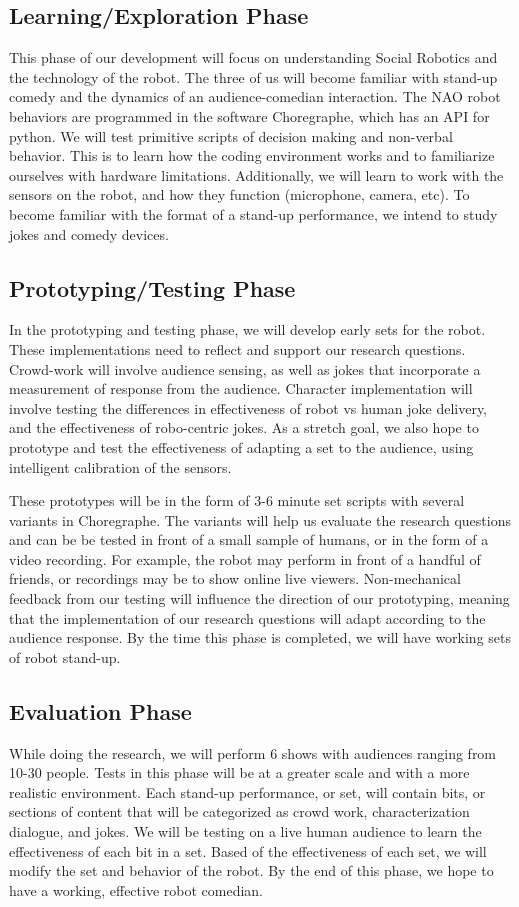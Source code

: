 \documentclass[onecolumn, draftclsnofoot,10pt, compsoc]{IEEEtran}
\begin{document}
\subsection{Learning/Exploration Phase}
This phase of our development will focus on understanding Social Robotics and the technology of the robot. The three of us will become familiar with stand-up comedy and the dynamics of an audience-comedian interaction. The NAO robot behaviors are programmed in the software Choregraphe, which has an API for python. We will test primitive scripts of decision making and non-verbal behavior. This is to learn how the coding environment works and to familiarize ourselves with hardware limitations. Additionally, we will learn to work with the sensors on the robot, and how they function (microphone, camera, etc). To become familiar with the format of a stand-up performance, we intend to study jokes and comedy devices.

\subsection{Prototyping/Testing Phase}
In the prototyping and testing phase, we will develop early sets for the robot. These implementations need to reflect and support our research questions. Crowd-work will involve audience sensing, as well as jokes that incorporate a measurement of response from the audience. Character implementation will involve testing the differences in effectiveness of robot vs human joke delivery, and the effectiveness of robo-centric jokes. As a stretch goal, we also hope to prototype and test the effectiveness of adapting a set to the audience, using intelligent calibration of the sensors.

These prototypes will be in the form of 3-6 minute set scripts with several variants in Choregraphe. The variants will help us evaluate the research questions and can be be tested in front of a small sample of humans, or in the form of a video recording. For example, the robot may perform in front of a handful of friends, or recordings may be to show online live viewers. Non-mechanical feedback from our testing will influence the direction of our prototyping, meaning that the implementation of our research questions will adapt according to the audience response. By the time this phase is completed, we will have working sets of robot stand-up.

\subsection{Evaluation Phase}
While doing the research, we will perform 6 shows with audiences ranging from 10-30 people. Tests in this phase will be at a greater scale and with a more realistic environment. Each stand-up performance, or set, will contain bits, or sections of content that will be categorized as crowd work, characterization dialogue, and jokes. We will be testing on a live human audience to learn the effectiveness of each bit in a set. Based of the effectiveness of each set, we will modify the set and behavior of the robot. By the end of this phase, we hope to have a working, effective robot comedian.
\end{document}
